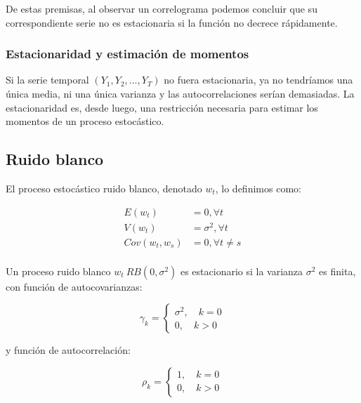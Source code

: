 \documentclass[a4paper,10pt]{article}
\begin{document}
De estas premisas, al observar un correlograma podemos concluir que su correspondiente serie no es estacionaria si la función no decrece rápidamente.

\subsubsection{Estacionaridad y estimación de momentos}

Si la serie temporal $(Y_1,Y_2,...,Y_T)$ no fuera estacionaria, ya no tendríamos una única media, ni una única varianza y las autocorrelaciones serían demasiadas. La estacionaridad es, desde luego, una restricción necesaria para estimar los momentos de un proceso estocástico.

\subsection{Ruido blanco}

El proceso estocástico ruido blanco, denotado $w_t$, lo definimos como:

\begin{equation*}
\begin{split}
E(w_t) &= 0, \forall t \\
V(w_t) &= \sigma^2, \forall t \\
Cov(w_t,w_s) &= 0, \forall t \neq s \\
\end{split}
\end{equation*}

Un proceso ruido blanco $w_t ~ RB(0,\sigma^2)$ es estacionario si la varianza $\sigma^2$ es finita, con función de autocovarianzas:

\begin{equation*}
\gamma_k= \left\{ \begin{array}{lcc}
             \sigma^2, \quad k=0 \\
             0, \quad k > 0
             \end{array}
   \right.
\end{equation*}

y función de autocorrelación:

\begin{equation*}
\rho_k= \left\{ \begin{array}{lcc}
             1, \quad k=0 \\
             0, \quad k > 0
             \end{array}
   \right.
\end{equation*}
\end{document}
